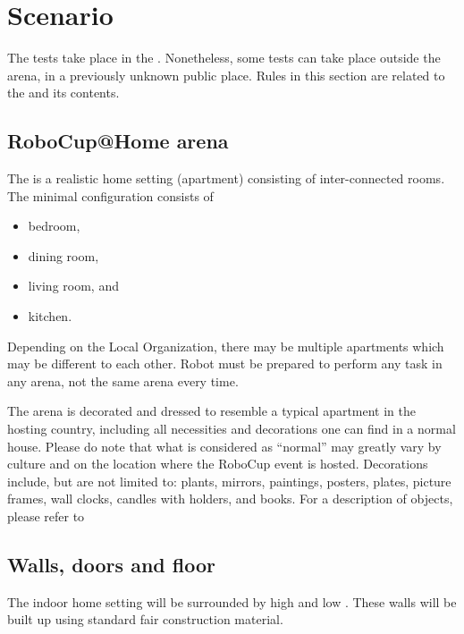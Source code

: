 \section{Scenario}
\label{sec:scenario}

The tests take place in the . Nonetheless, some tests can take place outside the arena, in a previously unknown public place. Rules in this section are related to the  and its contents.

\subsection{RoboCup@Home arena}
The  is a realistic home setting (apartment) consisting of inter-connected rooms.
The minimal configuration consists of
\begin{itemize}
	\item bedroom,
	\item dining room,
	\item living room, and
	\item kitchen.
\end{itemize}
Depending on the Local Organization, there may be multiple apartments which may be different to each other.
Robot must be prepared to perform any task in any arena, not the same arena every time.

The arena is decorated and dressed to resemble a typical apartment in the hosting country, including all necessities and decorations one can find in a normal house.
Please do note that what is considered as \enquote{normal} may greatly vary by culture and on the location where the RoboCup event is hosted.
Decorations include, but are not limited to: plants, mirrors, paintings, posters, plates, picture frames, wall clocks, candles with holders, and books.
For a description of objects, please refer to 

\subsection{Walls, doors and floor}
\label{rule:scenario_walls}

The indoor home setting will be surrounded by high and low .
These walls will be built up using standard fair construction material.

